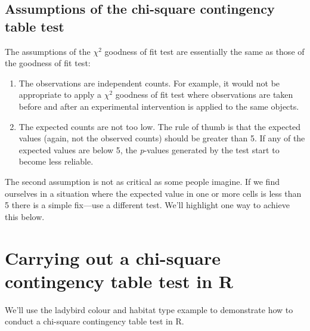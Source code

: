 \documentclass[
]{book}
\begin{document}
\hypertarget{assumptions-of-the-chi-square-contingency-table-test}{%
\subsection{Assumptions of the chi-square contingency table test}\label{assumptions-of-the-chi-square-contingency-table-test}}

The assumptions of the \(\chi^{2}\) goodness of fit test are essentially the same as those of the goodness of fit test:

\begin{enumerate}
\def\labelenumi{\arabic{enumi}.}
\item
  The observations are independent counts. For example, it would not be appropriate to apply a \(\chi^{2}\) goodness of fit test where observations are taken before and after an experimental intervention is applied to the same objects.
\item
  The expected counts are not too low. The rule of thumb is that the expected values (again, not the observed counts) should be greater than 5. If any of the expected values are below 5, the \emph{p}-values generated by the test start to become less reliable.
\end{enumerate}

The second assumption is not as critical as some people imagine. If we find ourselves in a situation where the expected value in one or more cells is less than 5 there is a simple fix---use a different test. We'll highlight one way to achieve this below.

\hypertarget{carrying-out-a-chi-square-contingency-table-test-in-r}{%
\section{Carrying out a chi-square contingency table test in R}\label{carrying-out-a-chi-square-contingency-table-test-in-r}}

We'll use the ladybird colour and habitat type example to demonstrate how to conduct a chi-square contingency table test in R.
\end{document}
